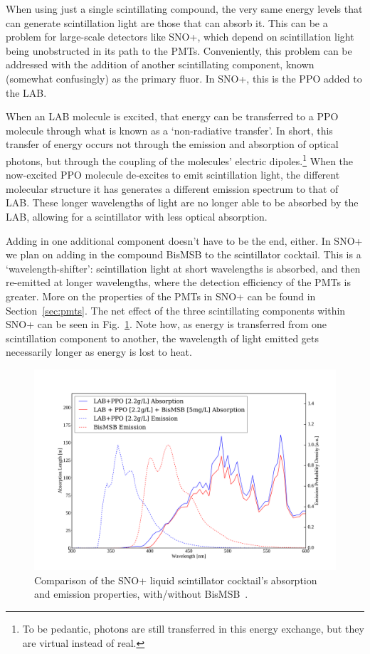 When using just a single scintillating compound, the very same energy levels that can generate scintillation light are those that can absorb it. This can be a problem for large-scale detectors like SNO+, which depend on scintillation light being unobstructed in its path to the PMTs. Conveniently, this problem can be addressed with the addition of another scintillating component, known (somewhat confusingly) as the primary fluor. In SNO+, this is the PPO added to the LAB.

When an LAB molecule is excited, that energy can be transferred to a PPO molecule through what is known as a `non-radiative transfer'. In short, this transfer of energy occurs not through the emission and absorption of optical photons, but through the coupling of the molecules' electric dipoles.\footnote{To be pedantic, photons are still transferred in this energy exchange, but they are virtual instead of real.}
When the now-excited PPO molecule de-excites to emit scintillation light, the different molecular structure it has generates a different emission spectrum to that of LAB. These longer wavelengths of light are no longer able to be absorbed by the LAB, allowing for a scintillator with less optical absorption.

Adding in one additional component doesn't have to be the end, either. In SNO+ we plan on adding in the compound BisMSB to the scintillator cocktail. This is a `wavelength-shifter': scintillation light at short wavelengths is absorbed, and then re-emitted at longer wavelengths, where the detection efficiency of the PMTs is greater. More on the properties of the PMTs in SNO+ can be found in Section~\ref{sec:pmts}. The net effect of the three scintillating components within SNO+ can be seen in Fig.~\ref{fig:scintillator_abs_emit_dist}. Note how, as energy is transferred from one scintillation component to another, the wavelength of light emitted gets necessarily longer as energy is lost to heat.

\begin{figure}
    \centering
    \includegraphics[width=0.8\linewidth]{2_Detector/Figs/scint_lengths_LABPPOBisMSB_plot_nice.pdf}
    \caption[Comparison of the SNO+ liquid scintillator cocktail's absorption and emission properties, with/without BisMSB.]
    {Comparison of the SNO+ liquid scintillator cocktail's absorption and emission properties, with/without BisMSB~\cite{}. %
    }
    \label{fig:scintillator_abs_emit_dist}
\end{figure}

